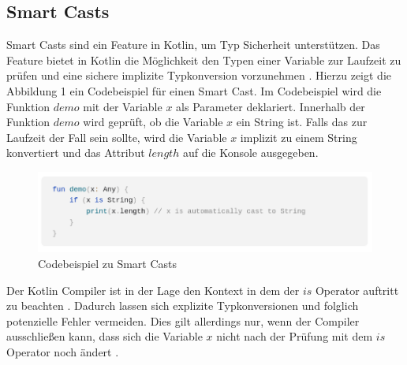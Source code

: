 \documentclass{article}
\begin{document}
\subsection{Smart Casts}
Smart Casts sind ein Feature in Kotlin, um Typ Sicherheit unterstützen. Das Feature bietet in Kotlin die Möglichkeit den Typen einer Variable zur Laufzeit zu prüfen und eine sichere implizite Typkonversion vorzunehmen \cite{KotlinLangDoc}. Hierzu zeigt die Abbildung 1 ein Codebeispiel für einen Smart Cast. Im Codebeispiel wird die Funktion $demo$ mit der Variable $x$ als Parameter deklariert. Innerhalb der Funktion $demo$ wird geprüft, ob die Variable $x$ ein String ist. Falls das zur Laufzeit der Fall sein sollte, wird die Variable $x$ implizit zu einem String konvertiert und das Attribut $length$ auf die Konsole ausgegeben.
\begin{figure}[!htb]
    \centering
    \includegraphics[width=\linewidth]{img/SmartCast.png}
    \caption{Codebeispiel zu Smart Casts\footnotemark}
\end{figure}
Der Kotlin Compiler ist in der Lage den Kontext in dem der $is$ Operator auftritt zu beachten \cite{KotlinLangDoc}. Dadurch lassen sich explizite Typkonversionen und folglich potenzielle Fehler vermeiden. Dies gilt allerdings nur, wenn der Compiler ausschließen kann, dass sich die Variable $x$ nicht nach der Prüfung mit dem $is$ Operator noch ändert \cite{KotlinLangDoc}.
\end{document}
